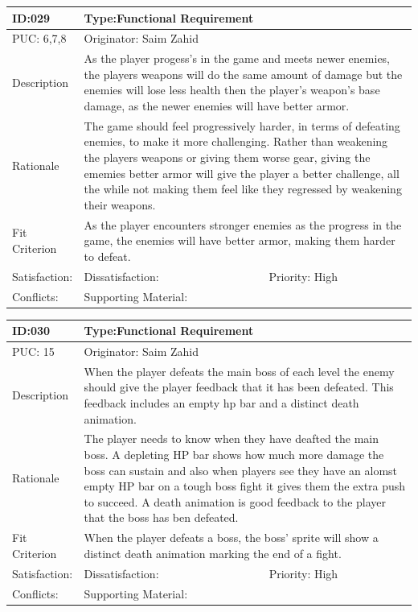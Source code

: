 \documentclass{article}
\begin{document}
	\begin{table}[H]
		\begin{tabular}{|l|l|l|}
			\hline
			ID:029 & \multicolumn{2}{l|}{Type:Functional Requirement} \\ \hline
			PUC: 6,7,8 & \multicolumn{2}{l|}{Originator: Saim Zahid} \\ \hline
			Description & \multicolumn{2}{m{0.85\textwidth}|}{As the player progess's in the game and meets newer enemies, the players weapons will do the same amount of damage but the enemies will lose less health then the player's weapon's base damage, as the newer enemies will have better armor.} \\ \hline
			Rationale & \multicolumn{2}{m{0.85\textwidth}|}{The game should feel progressively harder, in terms of defeating enemies, to make it more challenging. Rather than weakening the players weapons or giving them worse gear, giving the ememies better armor will give the player a better challenge, all the while not making them feel like they regressed by weakening their weapons.} \\ \hline
			Fit Criterion & \multicolumn{2}{m{0.85\textwidth}|}{As the player encounters stronger enemies as the progress in the game, the enemies will have better armor, making them harder to defeat.} \\ \hline
			Satisfaction: & Dissatisfaction: & Priority: High\\ \hline
			Conflicts: & \multicolumn{2}{l|}{Supporting Material:} \\ \hline
		\end{tabular}
	\end{table}

	\begin{table}[H]
		\begin{tabular}{|l|l|l|}
			\hline
			ID:030 & \multicolumn{2}{l|}{Type:Functional Requirement} \\ \hline
			PUC: 15 & \multicolumn{2}{l|}{Originator: Saim Zahid} \\ \hline
			Description & \multicolumn{2}{m{0.85\textwidth}|}{When the player defeats the main boss of each level the enemy should give the player feedback that it has been defeated. This feedback includes an empty hp bar and a distinct death animation.} \\ \hline
			Rationale & \multicolumn{2}{m{0.85\textwidth}|}{The player needs to know when they have deafted the main boss. A depleting HP bar shows how much more damage the boss can sustain and also when players see they have an alomst empty HP bar on a tough boss fight it gives them the extra push to succeed. A death animation is good feedback to the player that the boss has ben defeated.} \\ \hline
			Fit Criterion & \multicolumn{2}{m{0.85\textwidth}|}{When the player defeats a boss, the boss' sprite will show a distinct death animation marking the end of a fight.} \\ \hline
			Satisfaction: & Dissatisfaction: & Priority: High\\ \hline
			Conflicts: & \multicolumn{2}{l|}{Supporting Material:} \\ \hline
		\end{tabular}
	\end{table}
\end{document}
